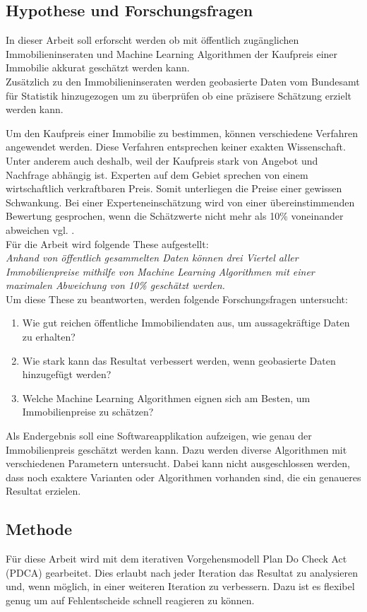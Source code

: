 \subsection{Hypothese und Forschungsfragen}
In dieser Arbeit soll erforscht werden ob mit öffentlich zugänglichen Immobilieninseraten und Machine Learning Algorithmen der Kaufpreis einer Immobilie akkurat geschätzt werden kann.\\
Zusätzlich zu den Immobilieninseraten werden geobasierte Daten vom Bundesamt für Statistik hinzugezogen um zu überprüfen ob eine präzisere Schätzung erzielt werden kann.

Um den Kaufpreis einer Immobilie zu bestimmen, können verschiedene Verfahren angewendet werden. Diese Verfahren entsprechen keiner exakten Wissenschaft. Unter anderem auch deshalb, weil der Kaufpreis stark von Angebot und Nachfrage abhängig ist. Experten auf dem Gebiet sprechen von einem wirtschaftlich verkraftbaren Preis. Somit unterliegen die Preise einer gewissen Schwankung. Bei einer Experteneinschätzung wird von einer übereinstimmenden Bewertung gesprochen, wenn die Schätzwerte nicht mehr als 10\% voneinander abweichen vgl. \cite{immo_1, immo_2}.\\[2ex]
%
Für die Arbeit wird folgende These aufgestellt:\\[2ex]
\textit{Anhand von öffentlich gesammelten Daten können drei Viertel aller Immobilienpreise mithilfe von Machine Learning Algorithmen mit einer maximalen Abweichung von 10\% geschätzt werden.}\\[4ex]
%
Um diese These zu beantworten, werden folgende Forschungsfragen untersucht:
\begin{enumerate}
\item Wie gut reichen öffentliche Immobiliendaten aus, um aussagekräftige Daten zu erhalten?
\item Wie stark kann das Resultat verbessert werden, wenn geobasierte Daten hinzugefügt werden?
\item Welche Machine Learning Algorithmen eignen sich am Besten, um Immobilienpreise zu schätzen?
\end{enumerate}
Als Endergebnis soll eine Softwareapplikation aufzeigen, wie genau der Immobilienpreis geschätzt werden kann. Dazu werden diverse Algorithmen mit verschiedenen Parametern untersucht. Dabei kann nicht ausgeschlossen werden, dass noch exaktere Varianten oder Algorithmen vorhanden sind, die ein genaueres Resultat erzielen.
%
\subsection{Methode}
Für diese Arbeit wird mit dem iterativen Vorgehensmodell Plan Do Check Act (PDCA) gearbeitet. Dies erlaubt nach jeder Iteration das Resultat zu analysieren und, wenn möglich, in einer weiteren Iteration zu verbessern. Dazu ist es flexibel genug um auf Fehlentscheide schnell reagieren zu können.
%
